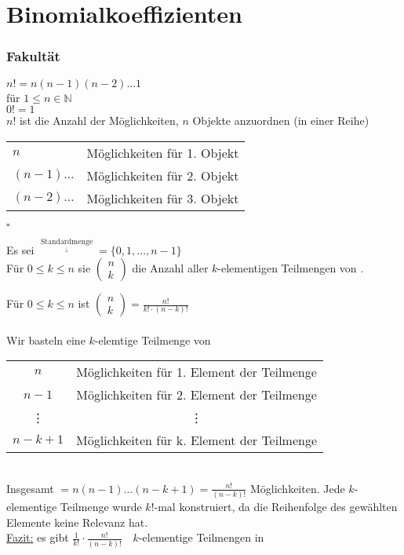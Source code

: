 \section{Binomialkoeffizienten}

%
%
%

\subsubsection{Fakultät}
$n! = n(n-1)(n-2)\dots1$\\
für $1\leq n\in\mathbb{N}$\\
$0!=1$\\

%
%
%

\stz
$n!$ ist die Anzahl der Möglichkeiten, $n$ Objekte anzuordnen (in einer Reihe)\\

%
%
%

\bws 

 \begin{tabular}{ll}
$n$  & Möglichkeiten für 1. Objekt \\
$(n-1)\dots$ & Möglichkeiten für 2. Objekt \\
$(n-2)\dots$ & Möglichkeiten für 3. Objekt\\
 \end{tabular}$\square$

%
%
%

Es sei $\mathop{\underline{n}}\limits^{\mathop{\textrm{Standardmenge}}\limits_{\downarrow}} = \{0,1,\dots,n-1\}$\\ 
Für $0\leq k \leq n$ sie $\begin{pmatrix} n \\ k \end{pmatrix}$ die Anzahl  aller $k$-elementigen Teilmengen von \n. 

%
%
%

\stz
Für $0\leq k \leq n$ ist $\begin{pmatrix} n \\ k \end{pmatrix} = \frac{n!}{k! \cdot (n-k)!} $ \\
\bws \\
Wir basteln eine $k$-elemtige Teilmenge von \n \\
\begin{tabular}{cc}
$n$ & Möglichkeiten für 1. Element der Teilmenge \\
$n-1$ & Möglichkeiten für 2. Element der Teilmenge  \\
 \vdots &  \vdots  \\
$n-k+1$ & Möglichkeiten für k. Element der Teilmenge \\
\end{tabular}
\\
Insgesamt $= n(n-1) \dotsc (n-k+1)=\frac{n!}{(n-k)!}$ Möglichkeiten. Jede $k$-elementige Teilmenge wurde $k!$-mal konstruiert, da die Reihenfolge des gewählten Elemente keine Relevanz hat.\\
\underline{Fazit:} es gibt $\frac{1}{k!} \cdot \frac{n!}{(n-k)!} \quad k$-elementige Teilmengen in \n

